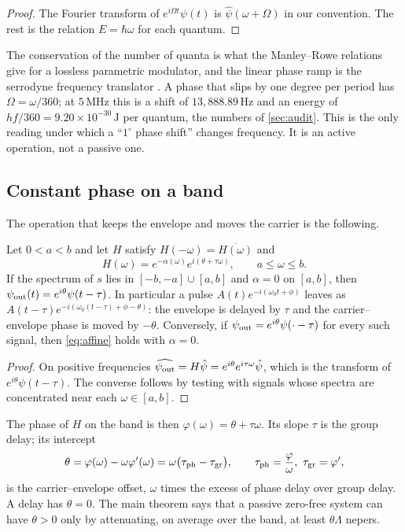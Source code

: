 \begin{proof}
The Fourier transform of $e^{i\Omega t}\psi(t)$ is $\hat\psi(\omega+\Omega)$
in our convention. The rest is the relation $E=\hbar\omega$ for each
quantum.
\end{proof}

The conservation of the number of quanta is what the Manley--Rowe relations
\cite{manley} give for a lossless parametric modulator, and the linear phase
ramp is the serrodyne frequency translator \cite{cumming}. A phase that slips
by one degree per period has $\Omega=\omega/360$; at $5$\,MHz this is a shift
of $13{,}888.89$\,Hz and an energy of $hf/360=9.20\times10^{-30}$\,J per
quantum, the numbers of \cref{sec:audit}. This is the only reading under
which a ``$1^\circ$ phase shift'' changes frequency. It is an active
operation, not a passive one.

\subsection{Constant phase on a band}

The operation that keeps the envelope and moves the carrier is the following.

\begin{proposition}\label{prop:cep}
Let $0<a<b$ and let $H$ satisfy $H(-\omega)=\overline{H(\omega)}$ and
\begin{equation}\label{eq:affine}
H(\omega)=e^{-\alpha(\omega)}e^{i(\theta+\tau\omega)},\qquad a\le\omega\le b .
\end{equation}
If the spectrum of $s$ lies in $[-b,-a]\cup[a,b]$ and $\alpha=0$ on $[a,b]$,
then $\psi_{\rm out}(t)=e^{i\theta}\psi(t-\tau)$. In particular a pulse
$A(t)e^{-i(\omega_0t+\phi)}$ leaves as $A(t-\tau)e^{-i(\omega_0(t-\tau)+\phi-\theta)}$:
the envelope is delayed by $\tau$ and the carrier--envelope phase is moved
by $-\theta$. Conversely, if $\psi_{\rm out}=e^{i\theta}\psi(\cdot-\tau)$ for
every such signal, then \eqref{eq:affine} holds with $\alpha=0$.
\end{proposition}

\begin{proof}
On positive frequencies $\widehat{\psi_{\rm out}}=H\hat\psi
=e^{i\theta}e^{i\tau\omega}\hat\psi$, which is the transform of
$e^{i\theta}\psi(t-\tau)$. The converse follows by testing with signals whose
spectra are concentrated near each $\omega\in[a,b]$.
\end{proof}

The phase of $H$ on the band is then $\varphi(\omega)=\theta+\tau\omega$. Its
slope $\tau$ is the group delay; its intercept
\[
\theta=\varphi(\omega)-\omega\varphi'(\omega)=\omega\big(\tau_{\rm ph}-\tau_{\rm gr}\big),
\qquad \tau_{\rm ph}=\frac{\varphi}{\omega},\ \tau_{\rm gr}=\varphi',
\]
is the carrier--envelope offset, $\omega$ times the excess of phase delay
over group delay. A delay has $\theta=0$. The main theorem says that a passive
zero-free system can have $\theta>0$ only by attenuating, on average over the
band, at least $\theta\Lambda$ nepers.
